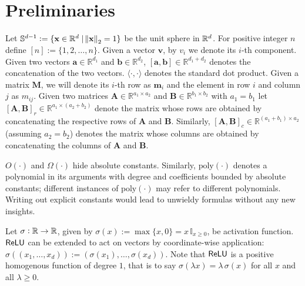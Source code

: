 \section{Preliminaries}
Let
$\mathbb{S}^{d-1} := \{\mathbf{x} \in \mathbb{R}^d \mid \norm{\mathbf{x}}_2 = 1\}$ be the unit sphere in $\mathbb{R}^d$.
For positive integer $n$ define $[n]:=\{1, 2, \ldots, n\}$. 
Given a vector $\mathbf{v}$, by $v_i$ we denote its $i$-th component.
Given two vectors $\mathbf{a} \in \mathbb{R}^{d_1}$ and $\mathbf{b} \in \mathbb{R}^{d_2}$, $[\mathbf{a}, \mathbf{b}] \in \mathbb{R}^{d_1 + d_2}$ denotes the concatenation of the two vectors. $\langle \cdot, \cdot \rangle$ denotes the standard dot product. 
Given a matrix $\mathbf{M}$, we will denote its $i$-th row as $\mathbf{m}_i$ and the element in row $i$ and column $j$ as $m_{ij}$. Given two matrices $\mathbf{A} \in \mathbb{R}^{a_1 \times a_2}$ and $\mathbf{B} \in \mathbb{R}^{b_1 \times b_2}$ with $a_1 = b_1$ let $[\mathbf{A}, \mathbf{B}]_r \in \mathbb{R}^{a_1 \times (a_2 + b_2)}$ denote the matrix whose rows are obtained by concatenating the respective rows of $\mathbf{A}$ and $\mathbf{B}$. Similarly, $[\mathbf{A}, \mathbf{B}]_c \in \mathbb{R}^{(a_1 + b_1) \times a_2 }$ (assuming $a_2 = b_2$) denotes the matrix whose columns are obtained by concatenating the columns of $\mathbf{A}$ and $\mathbf{B}$. 

$O(\cdot)$ and $\Omega(\cdot)$ hide absolute constants. Similarly, $\mathrm{poly}(\cdot)$ denotes a polynomial in its arguments with degree and coefficients bounded by absolute constants; different instances of $\mathrm{poly}(\cdot)$ may refer to different polynomials. Writing out explicit constants would lead to unwieldy formulas without any new insights.


Let $\sigma: \mathbb{R} \to \mathbb{R}$, given by $\sigma(x) := \max\{x, 0\} = x \,\mathbb{I}_{x \ge 0}$, be {\relu} activation function. 
$\mathsf{ReLU}$ can be extended to act on vectors by coordinate-wise application: $\sigma((x_1, \ldots, x_d)) := (\sigma(x_1), \ldots, \sigma(x_d))$.
Note that 
$\mathsf{ReLU}$ is a positive homogenous function of degree $1$, that is to say $\sigma(\lambda x) = \lambda \, \sigma(x)$ for all $x$ and all $\lambda \geq 0$. 




